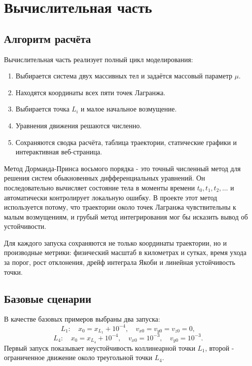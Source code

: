 \newpage
\section*{Вычислительная часть}

\subsection*{Алгоритм расчёта}

Вычислительная часть реализует полный цикл моделирования:
\begin{enumerate}
  \item Выбирается система двух массивных тел и задаётся массовый параметр $\mu$.
  \item Находятся координаты всех пяти точек Лагранжа.
  \item Выбирается точка $L_i$ и малое начальное возмущение.
  \item Уравнения движения решаются численно.
  \item Сохраняются сводка расчёта, таблица траектории, статические графики
  и интерактивная веб-страница.
\end{enumerate}

Метод Дорманда-Принса восьмого порядка - это точный численный метод для
решения систем обыкновенных дифференциальных уравнений. Он последовательно
вычисляет состояние тела в моменты времени $t_0,t_1,t_2,\ldots$ и автоматически
контролирует локальную ошибку. В проекте этот метод используется потому, что
траектории около точек Лагранжа чувствительны к малым возмущениям, и грубый
метод интегрирования мог бы исказить вывод об устойчивости.

Для каждого запуска сохраняются не только координаты траектории, но и
производные метрики: физический масштаб в километрах и сутках, время ухода за
порог, рост отклонения, дрейф интеграла Якоби и линейная устойчивость точки.

\subsection*{Базовые сценарии}

В качестве базовых примеров выбраны два запуска:
\[
  L_1:\quad x_0=x_{L_1}+10^{-4},\quad v_{x0}=v_{y0}=v_{z0}=0,
\]
\[
  L_4:\quad x_0=x_{L_4}+10^{-4},\quad v_{x0}=10^{-3},\quad v_{y0}=10^{-3}.
\]
Первый запуск показывает неустойчивость коллинеарной точки $L_1$, второй -
ограниченное движение около треугольной точки $L_4$.

